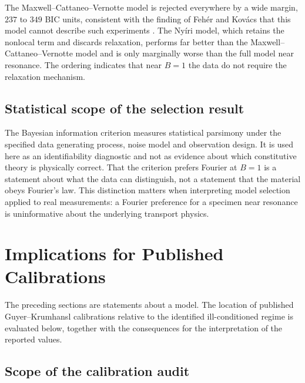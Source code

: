 \documentclass[preprint,12pt,a4paper]{elsarticle}
\theoremstyle{plain}
\theoremstyle{definition}
\theoremstyle{remark}
\newcommand{\Bnum}{B}
\begin{document}
The Maxwell--Cattaneo--Vernotte model is rejected everywhere by a wide margin,
$237$ to $349$ BIC units, consistent with the finding of Feh\'er and Kov\'acs
that this model cannot describe such experiments \cite{FeherKovacs2021}. The
Nyíri model, which retains the nonlocal term and discards relaxation, performs
far better than the Maxwell--Cattaneo--Vernotte model and is only marginally
worse than the full model near resonance. The ordering indicates that near
$\Bnum = 1$ the data do not require the relaxation mechanism.

\subsection{Statistical scope of the selection result}
\label{sec:ms-interp}

The Bayesian information criterion measures statistical parsimony under the
specified data generating process, noise model and observation design. It is
used here as an identifiability diagnostic and not as evidence about which
constitutive theory is physically correct. That the criterion prefers Fourier
at $\Bnum = 1$ is a statement about what the data can distinguish, not a
statement that the material obeys Fourier's law. This distinction matters when
interpreting model selection applied to real measurements: a Fourier
preference for a specimen near resonance is uninformative about the underlying
transport physics.


\section{Implications for Published Calibrations}
\label{sec:calibration}

The preceding sections are statements about a model. The location of published
Guyer--Krumhansl calibrations relative to the identified ill-conditioned regime
is evaluated below, together with the consequences for the interpretation of the
reported values.

\subsection{Scope of the calibration audit}
\label{sec:cal-framing}
\end{document}
